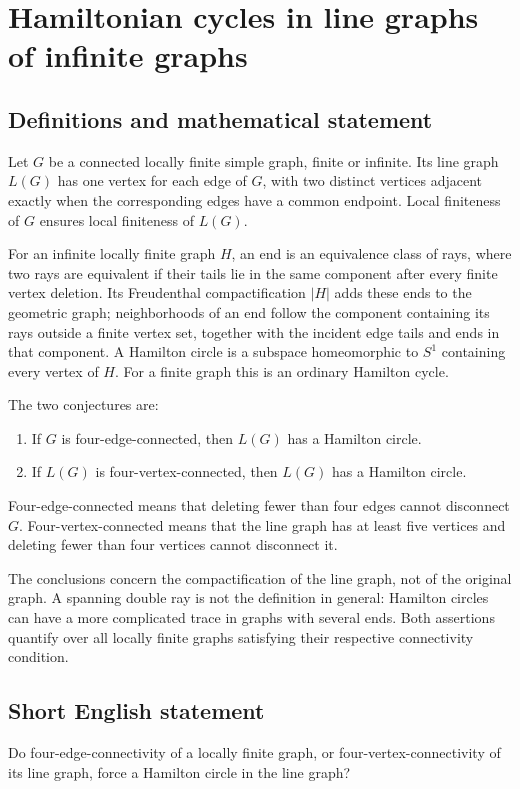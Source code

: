 \documentclass[11pt,a4paper]{article}
\begin{document}
\section*{Hamiltonian cycles in line graphs of infinite graphs}\label{statement}

\subsection{Definitions and mathematical statement}
Let $G$ be a connected locally finite simple graph, finite or infinite. Its line graph $L(G)$ has one vertex for each edge of $G$, with two distinct vertices adjacent exactly when the corresponding edges have a common endpoint. Local finiteness of $G$ ensures local finiteness of $L(G)$.

For an infinite locally finite graph $H$, an end is an equivalence class of rays, where two rays are equivalent if their tails lie in the same component after every finite vertex deletion. Its Freudenthal compactification $|H|$ adds these ends to the geometric graph; neighborhoods of an end follow the component containing its rays outside a finite vertex set, together with the incident edge tails and ends in that component. A Hamilton circle is a subspace homeomorphic to $S^1$ containing every vertex of $H$. For a finite graph this is an ordinary Hamilton cycle.

The two conjectures are:
\begin{enumerate}
\item If $G$ is four-edge-connected, then $L(G)$ has a Hamilton circle.
\item If $L(G)$ is four-vertex-connected, then $L(G)$ has a Hamilton circle.
\end{enumerate}
Four-edge-connected means that deleting fewer than four edges cannot disconnect $G$. Four-vertex-connected means that the line graph has at least five vertices and deleting fewer than four vertices cannot disconnect it.

The conclusions concern the compactification of the line graph, not of the original graph. A spanning double ray is not the definition in general: Hamilton circles can have a more complicated trace in graphs with several ends. Both assertions quantify over all locally finite graphs satisfying their respective connectivity condition.
\subsection{Short English statement}
Do four-edge-connectivity of a locally finite graph, or four-vertex-connectivity of its line graph, force a Hamilton circle in the line graph?
\end{document}

